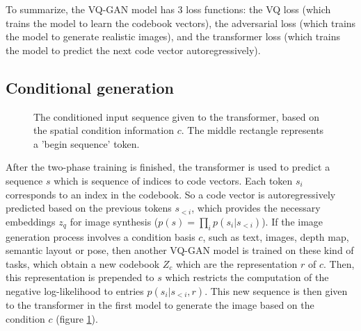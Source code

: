 To summarize, the VQ-GAN model has 3 loss functions: the VQ loss (which trains the model to learn the codebook vectors), the adversarial loss (which trains the model to generate realistic images), and the transformer loss (which trains the model to predict the next code vector autoregressively).







\subsection{Conditional generation}

\begin{figure}
    \centering
    \caption{The conditioned input sequence given to the transformer, based on the spatial condition information $c$. The middle rectangle represents a 'begin sequence' token.}
    \label{fig:vqgan_conditional_generation}
\end{figure}

After the two-phase training is finished, the transformer is used to predict a sequence $s$ which is sequence of indices to code vectors. Each token $s_i$ corresponds to an index in the codebook. So a code vector is autoregressively predicted based on the previous tokens $s_{<i}$, which provides the necessary embeddings $z_q$ for image synthesis ($p(s) = \prod_{i} p(s_i | s_{<i})$). If the image generation process involves a condition basis $c$, such as text, images, depth map, semantic layout or pose, then another VQ-GAN model is trained on these kind of tasks, which obtain a new codebook $Z_c$ which are the representation $r$ of $c$. Then, this representation is prepended to $s$ which restricts the computation of the negative log-likelihood to entries $p(s_i | s_{<i}, r)$. This new sequence is then given to the transformer in the first model to generate the image based on the condition $c$ (figure \ref{fig:vqgan_conditional_generation}).








